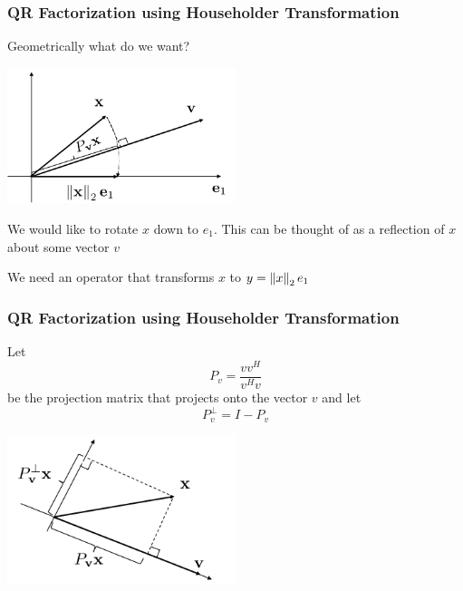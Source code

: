 \documentclass{beamer}
\begin{document}
\begin{frame}\frametitle{QR Factorization using Householder Transformation}

	Geometrically what do we want?\\
	
		\begin{center}
		\includegraphics[width=0.5\textwidth]{figures/chap5_householder_1}
		\end{center}
	
	We would like to rotate $x$ down to $e_1$.  This can be thought of as a reflection of $x$ about some vector $v$
	
	\vfill
	
	We need an operator that transforms $x$ to $y=\left\|x \right\|_2e_1$
		
\end{frame}

\begin{frame}\frametitle{QR Factorization using Householder Transformation}

	Let 
	\[
		P_v = \frac{vv^H}{v^Hv}
	\] 
	be the projection matrix that projects onto the vector $v$ and let 
	\[
		P_v^{\perp} = I - P_v
	\]

	\begin{center}
	\includegraphics[width=0.5\textwidth]{figures/chap5_householder_2}
	\end{center}
	
\end{frame}
\end{document}
